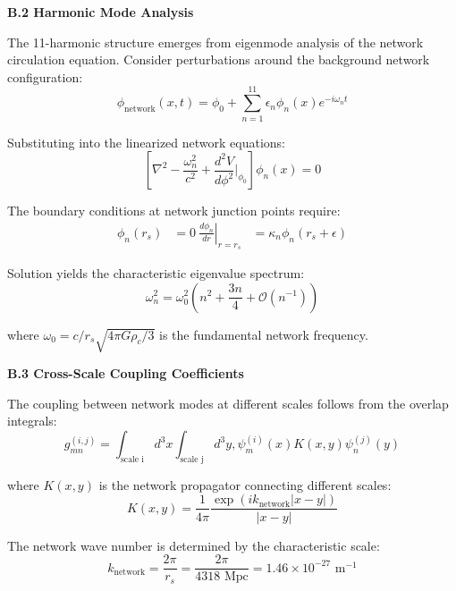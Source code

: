 \documentclass[11pt,a4paper]{article}
\begin{document}
\textbf{B.2 Harmonic Mode Analysis}

The 11-harmonic structure emerges from eigenmode analysis of the network circulation equation. Consider perturbations around the background network configuration:
\begin{equation}
\phi_{\text{network}}(x,t) = \phi_0 + \sum_{n=1}^{11} \epsilon_n \phi_n(x) e^{-i\omega_n t}
\label{eq:harmonic_decomposition}
\end{equation}

Substituting into the linearized network equations:
\begin{equation}
\left[\nabla^2 - \frac{\omega_n^2}{c^2} + \frac{d^2V}{d\phi^2}\bigg|_{\phi_0}\right]\phi_n(x) = 0
\label{eq:linearized_network_equation}
\end{equation}

The boundary conditions at network junction points require:
\begin{align}
\phi_n(r_s) &= 0 \
\left.\frac{d\phi_n}{dr}\right|_{r=r_s} &= \kappa_n \phi_n(r_s + \epsilon)
\label{eq:junction_boundary_conditions}
\end{align}

Solution yields the characteristic eigenvalue spectrum:
\begin{equation}
\omega_n^2 = \omega_0^2\left(n^2 + \frac{3n}{4} + \mathcal{O}(n^{-1})\right)
\label{eq:eigenvalue_spectrum}
\end{equation}

where $\omega_0 = c/r_s \sqrt{4\pi G\rho_c/3}$ is the fundamental network frequency.

\textbf{B.3 Cross-Scale Coupling Coefficients}

The coupling between network modes at different scales follows from the overlap integrals:
\begin{equation}
g_{mn}^{(i,j)} = \int_{\text{scale i}} d^3x \int_{\text{scale j}} d^3y , \psi_m^{(i)}(x) K(x,y) \psi_n^{(j)}(y)
\label{eq:cross_scale_coupling}
\end{equation}

where $K(x,y)$ is the network propagator connecting different scales:
\begin{equation}
K(x,y) = \frac{1}{4\pi} \frac{\exp(ik_{\text{network}}|x-y|)}{|x-y|}
\label{eq:network_propagator}
\end{equation}

The network wave number is determined by the characteristic scale:
\begin{equation}
k_{\text{network}} = \frac{2\pi}{r_s} = \frac{2\pi}{4318 \text{ Mpc}} = 1.46 \times 10^{-27} \text{ m}^{-1}
\label{eq:network_wave_number}
\end{equation}
\end{document}
